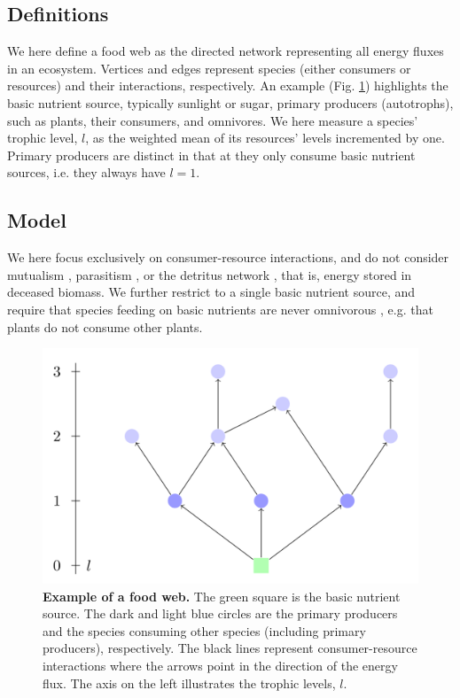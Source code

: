 \subsection{Definitions}
We here define a food web as the directed network representing all energy fluxes in an ecosystem. Vertices and edges represent species (either consumers or resources) and their interactions, respectively. 
An example (Fig. \ref{FIG:web}) highlights the basic nutrient source, typically sunlight or sugar, primary producers (autotrophs), such as plants, their consumers, and omnivores.  
We here measure a species' trophic level, $l$, as the weighted mean of its resources' levels incremented by one.
Primary producers are distinct in that at they only consume basic nutrient sources, i.e. they always have $l = 1$.

\subsection{Model}
We here focus exclusively on consumer-resource interactions, and do not consider mutualism \cite{bastolla2009architecture}, parasitism \cite{combes2001parasitism}, or the detritus network \cite{moore2004detritus}, that is, energy stored in deceased biomass.
We further restrict to a single basic nutrient source, and require that species feeding on basic nutrients are never omnivorous \cite{agrawal2000omnivores}, e.g. that plants do not consume other plants.

\begin{figure}
	\centering
		\includegraphics[scale=.55]{figs/web.png}
	    \caption{\textbf{Example of a food web.} The green square is the basic nutrient source. The dark and light blue circles are the primary producers and the species consuming other species (including primary producers), respectively. The black lines represent consumer-resource interactions where the arrows point in the direction of the energy flux. 
        The axis on the left illustrates the trophic levels, $l$.}
	    \label{FIG:web}
\end{figure}

